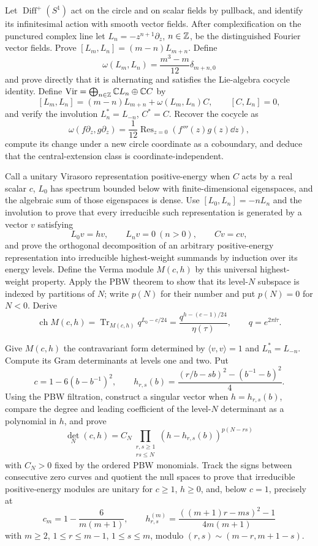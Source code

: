 \begin{exercise}
Let $\operatorname{Diff}^+(S^1)$ act on the circle and on scalar fields by
pullback, and identify its infinitesimal action with smooth vector fields.
After complexification on the punctured complex line let
$L_n=-z^{n+1}\partial_z$, $n\in\mathbb Z$, be the distinguished Fourier vector
fields.  Prove
$[L_m,L_n]=(m-n)L_{m+n}$.  Define
\[
 \omega(L_m,L_n)=\frac{m^3-m}{12}\delta_{m+n,0}
\]
and prove directly that it is alternating and satisfies the Lie-algebra
cocycle identity.  Define
$\operatorname{Vir}=\bigoplus_{n\in\mathbb Z}\mathbb C L_n\oplus\mathbb C C$ by
\[
 [L_m,L_n]=(m-n)L_{m+n}+\omega(L_m,L_n)C,
 \qquad [C,L_n]=0,
\]
and verify the involution $L_n^*=L_{-n}$, $C^*=C$.  Recover the cocycle as
\[
 \omega(f\partial_z,g\partial_z)
 =\frac1{12}\operatorname{Res}_{z=0}(f'''(z)g(z)\dd z),
\]
compute its change under a new circle coordinate as a coboundary, and deduce
that the central-extension class is coordinate-independent.
\end{exercise}

\begin{exercise}
Call a unitary Virasoro representation positive-energy when $C$ acts by a
real scalar $c$, $L_0$ has spectrum bounded below with finite-dimensional
eigenspaces, and the algebraic sum of those eigenspaces is dense.  Use
$[L_0,L_n]=-nL_n$ and the involution to prove that every irreducible such
representation is generated by a vector $v$ satisfying
\[
 L_0v=hv,\qquad L_nv=0\ (n>0),\qquad Cv=cv,
\]
and prove the orthogonal decomposition of an arbitrary positive-energy
representation into irreducible highest-weight summands by induction over
its energy levels.  Define the Verma module $M(c,h)$ by this universal
highest-weight property.  Apply the PBW theorem to show that its level-$N$
subspace is indexed by partitions of $N$; write $p(N)$ for their number and
put $p(N)=0$ for $N<0$.  Derive
\[
 \operatorname{ch}M(c,h)
 =\operatorname{Tr}_{M(c,h)}q^{L_0-c/24}
 =\frac{q^{h-(c-1)/24}}{\eta(\tau)},
 \qquad q=e^{2\pi\ii\tau}.
\]
\end{exercise}

\begin{exercise}
Give $M(c,h)$ the contravariant form determined by
$\langle v,v\rangle=1$ and $L_n^*=L_{-n}$.  Compute its Gram determinants
at levels one and two.  Put
\[
 c=1-6(b-b^{-1})^2,
 \qquad
 h_{r,s}(b)=\frac{(r/b-sb)^2-(b^{-1}-b)^2}{4}.
\]
Using the PBW filtration, construct a singular vector when
$h=h_{r,s}(b)$, compare the degree and leading coefficient of the level-$N$
determinant as a polynomial in $h$, and prove
\[
 \det_N(c,h)=C_N
 \prod_{\substack{r,s\geq1\\rs\leq N}}
 (h-h_{r,s}(b))^{p(N-rs)}
\]
with $C_N>0$ fixed by the ordered PBW monomials.  Track the signs between
consecutive zero curves and quotient the null spaces to prove
that irreducible positive-energy modules are unitary for $c\geq1$, $h\geq0$,
and, below $c=1$, precisely at
\[
 c_m=1-\frac6{m(m+1)},\qquad
 h_{r,s}^{(m)}=\frac{((m+1)r-ms)^2-1}{4m(m+1)}
\]
with $m\geq2$, $1\leq r\leq m-1$, $1\leq s\leq m$, modulo
$(r,s)\sim(m-r,m+1-s)$.
\end{exercise}

